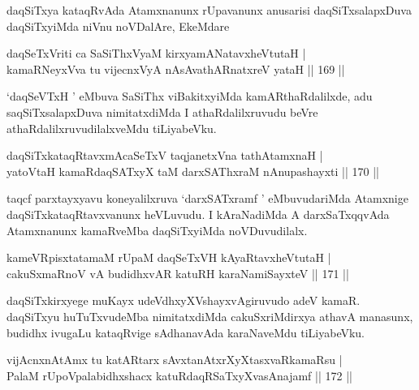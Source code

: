 \begin{artha}
daqSiTxya kataqRvAda Atamxnanunx rUpavanunx anusarisi daqSiTxsalapxDuva daqSiTxyiMda niVnu noVDalAre, EkeMdare
\end{artha}

\begin{shl}
daqSeTxVriti ca SaSiThxVyaM kirxyamANatavxheVtutaH |\\
kamaRNeyxVva tu vijecnxVyA nAsAvathARnatxreV yataH \hfill || 169 ||
\end{shl}

\begin{artha}
`daqSeVTxH ' eMbuva SaSiThx viBakitxyiMda kamARthaRdalilxde, adu saqSiTxsalapxDuva nimitatxdiMda I athaRdalilxruvudu beVre athaRdalilxruvudilalxveMdu tiLiyabeVku.
\end{artha}


\begin{shl}
daqSiTxkataqRtavxmAcaSeTxV taqjanetxVna tathA\s \s tamxnaH |\\
yatoV\s taH kamaRdaqSATxyX taM darxSAThxraM nAnupashayxti \hfill || 170 ||
\end{shl}

\begin{artha}
taqcf parxtayxyavu koneyalilxruva `darxSATxramf ' eMbuvudariMda Atamxnige daqSiTxkataqRtavxvanunx heVLuvudu. I kAraNadiMda A darxSaTxqqvAda Atamxnanunx kamaRveMba daqSiTxyiMda noVDuvudilalx.
\end{artha}


\begin{shl}
kameVRpisxtatamaM rUpaM daqSeTxVH kAyaRtavxheVtutaH |\\
cakuSxmaRnoV vA budidhxvAR katuRH karaNamiSayxteV \hfill || 171 ||
\end{shl}

\begin{artha}
daqSiTxkirxyege muKayx udeVdhxyXVshayxvAgiruvudo adeV kamaR. daqSiTxyu huTuTxvudeMba nimitatxdiMda cakuSxriMdirxya athavA manasunx, budidhx ivugaLu kataqRvige sAdhanavAda karaNaveMdu tiLiyabeVku.
\end{artha}


\begin{shl}
vijAcnxnAtAmx tu katAR\s tarx sAvxtanAtxrXyXtasxvaRkamaRsu |\\
PalaM rUpoVpalabidhxshacx katuRdaqRSaTxyXvasAnajamf \hfill || 172 ||
\end{shl}


